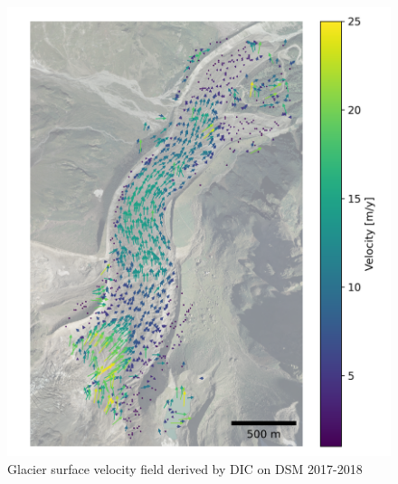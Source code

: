 \begin{figure}
    \centering
    \includegraphics[height=\textheight]{figures/chapter3/velocity_DIC_2017-2018.png}
    \caption[]{Glacier surface velocity field derived by DIC on DSM 2017-2018}
\end{figure}

